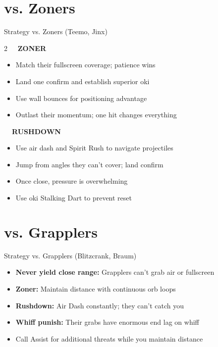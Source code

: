 \documentclass[12pt, a4paper]{report}
\newcommand{\faFistRaised}{\ding{108}}
\newcommand{\faBookOpen}{\ding{70}}
\begin{document}
\section{vs. Zoners}

\begin{matchupbox}[]{Strategy vs. Zoners (Teemo, Jinx)}
\begin{multicols}{2}
\textcolor{ahriCyan}{\bfseries\sffamily\faBookOpen\ \ ZONER}
\begin{itemize}
  \item Match their fullscreen coverage; patience wins
  \item Land one confirm and establish superior oki
  \item Use wall bounces for positioning advantage
  \item Outlast their momentum; one hit changes everything
\end{itemize}
\columnbreak
\textcolor{ahriMagenta}{\bfseries\sffamily\faFistRaised\ \ RUSHDOWN}
\begin{itemize}
  \item Use air dash and Spirit Rush to navigate projectiles
  \item Jump from angles they can't cover; land confirm
  \item Once close, pressure is overwhelming
  \item Use oki Stalking Dart to prevent reset
\end{itemize}
\end{multicols}
\end{matchupbox}

\section{vs. Grapplers}

\begin{matchupbox}[]{Strategy vs. Grapplers (Blitzcrank, Braum)}
\begin{itemize}
  \item \textbf{Never yield close range:} Grapplers can't grab air or fullscreen
  \item \textbf{Zoner:} Maintain distance with continuous orb loops
  \item \textbf{Rushdown:} Air Dash constantly; they can't catch you
  \item \textbf{Whiff punish:} Their grabs have enormous end lag on whiff
  \item Call Assist for additional threats while you maintain distance
\end{itemize}
\end{matchupbox}
\end{document}
